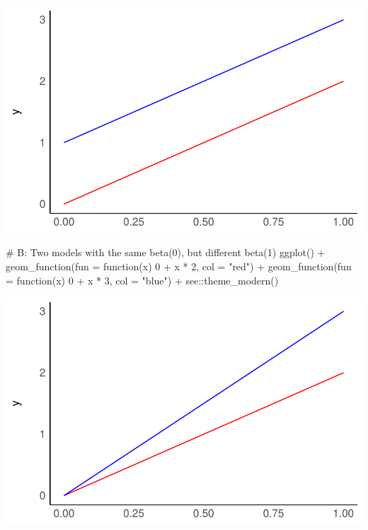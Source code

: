 \documentclass[
  letterpaper,
]{krantz}
\makeatletter
\newenvironment{Shaded}{\begin{snugshade}}{\end{snugshade}}
\newcommand{\AttributeTok}[1]{\textcolor[rgb]{0.40,0.45,0.13}{#1}}
\newcommand{\CommentTok}[1]{\textcolor[rgb]{0.37,0.37,0.37}{#1}}
\newcommand{\ControlFlowTok}[1]{\textcolor[rgb]{0.00,0.23,0.31}{#1}}
\newcommand{\DecValTok}[1]{\textcolor[rgb]{0.68,0.00,0.00}{#1}}
\newcommand{\FunctionTok}[1]{\textcolor[rgb]{0.28,0.35,0.67}{#1}}
\newcommand{\NormalTok}[1]{\textcolor[rgb]{0.00,0.23,0.31}{#1}}
\newcommand{\SpecialCharTok}[1]{\textcolor[rgb]{0.37,0.37,0.37}{#1}}
\newcommand{\StringTok}[1]{\textcolor[rgb]{0.13,0.47,0.30}{#1}}
\newenvironment{kframe}{%
\medskip{}
\setlength{\fboxsep}{.8em}
 \def\at@end@of@kframe{}%
 \ifinner\ifhmode%
  \def\at@end@of@kframe{\end{minipage}}%
  \begin{minipage}{\columnwidth}%
 \fi\fi%
 \def\FrameCommand##1{\hskip\@totalleftmargin \hskip-\fboxsep
 \colorbox{shadecolor}{##1}\hskip-\fboxsep
     \hskip-\linewidth \hskip-\@totalleftmargin \hskip\columnwidth}%
 \MakeFramed {\advance\hsize-\width
   \@totalleftmargin\z@ \linewidth\hsize
   \@setminipage}}%
 {\par\unskip\endMakeFramed%
 \at@end@of@kframe}
\renewenvironment{Shaded}{\begin{kframe}}{\end{kframe}}
\makeatother
\begin{document}
\includegraphics{13_regressions_files/figure-pdf/beta-zero-beta-one-explained-1.pdf}

\begin{Shaded}
\begin{Highlighting}[]
\CommentTok{\# B: Two models with the same beta(0), but different beta(1)}
\FunctionTok{ggplot}\NormalTok{() }\SpecialCharTok{+}
  \FunctionTok{geom\_function}\NormalTok{(}\AttributeTok{fun =} \ControlFlowTok{function}\NormalTok{(x) }\DecValTok{0} \SpecialCharTok{+}\NormalTok{ x }\SpecialCharTok{*} \DecValTok{2}\NormalTok{, }\AttributeTok{col =} \StringTok{"red"}\NormalTok{) }\SpecialCharTok{+}
  \FunctionTok{geom\_function}\NormalTok{(}\AttributeTok{fun =} \ControlFlowTok{function}\NormalTok{(x) }\DecValTok{0} \SpecialCharTok{+}\NormalTok{ x }\SpecialCharTok{*} \DecValTok{3}\NormalTok{, }\AttributeTok{col =} \StringTok{"blue"}\NormalTok{) }\SpecialCharTok{+}
\NormalTok{  see}\SpecialCharTok{::}\FunctionTok{theme\_modern}\NormalTok{()}
\end{Highlighting}
\end{Shaded}

\includegraphics{13_regressions_files/figure-pdf/beta-zer-beta-one-explained-diff-1.pdf}
\end{document}
